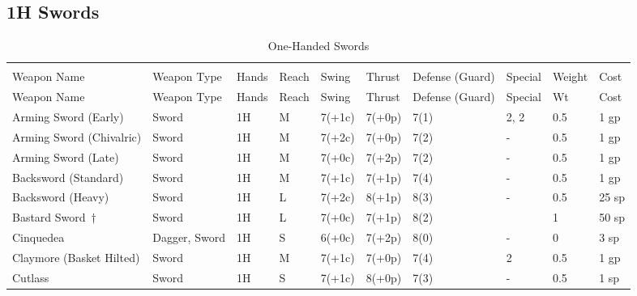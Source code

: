 \documentclass[oneside,11pt,english]{book}
\begin{document}
\subsection{1H Swords}\vspace{-15pt}
\begin{longtabu} to 1\linewidth {X[2,l]XX[-1,c]X[-1,c]XXX[-1,c]X[2,l]X[-3,c]X[-3,r]}
  \captionsetup{labelformat=blank,textformat=empty}
  \caption{One-Handed Swords}\vspace{-15pt}
  \label{tab:1H Swords}\\
  Weapon Name						&Weapon Type	&Hands&Reach&Swing&Thrust&Defense (Guard)&Special						&Weight	&Cost\\\toprule\endfirsthead
  Weapon Name					&Weapon Type    &Hands   &Reach  &Swing  &Thrust &Defense (Guard)  &Special                                 &Wt  &Cost\\\toprule\endhead
  Arming Sword (Early)        &Sword          &1H      &M      &7(+1c) &7(+0p) &7(1)           & 2,  2                 &0.5 &1 gp\\
  Arming Sword (Chivalric)    &Sword          &1H      &M      &7(+2c) &7(+0p) &7(2)           &-                                       &0.5 &1 gp\\
  Arming Sword (Late)         &Sword          &1H      &M      &7(+0c) &7(+2p) &7(2)           &-                                       &0.5 &1 gp\\
  Backsword (Standard)        &Sword          &1H      &M      &7(+1c) &7(+1p) &7(4)           &-                                       &0.5 &1 gp\\
  Backsword (Heavy)           &Sword          &1H      &L      &7(+2c) &8(+1p) &8(3)           &-                                       &0.5 &25 sp\\
  {Bastard Sword\  \label{wep:bastard-sword-1h}}\hyperref[wep:bastard-sword-2h]{$ \dagger $}              &Sword          &1H      &L      &7(+0c) &7(+1p) &8(2)           &                            &1   &50 sp\\
  Cinquedea                   &Dagger, Sword  &1H      &S      &6(+0c) &7(+2p) &8(0)           &-                                       &0   &3 sp\\
  Claymore (Basket Hilted)	&Sword		&1H      &M      &7(+1c) &7(+0p) &7(4)           & 2                           &0.5 &1 gp\\
  Cutlass						&Sword          &1H      &S      &7(+1c) &8(+0p) &7(3)           &-                                       &0.5 &1 sp\\

\end{longtabu}
\end{document}
